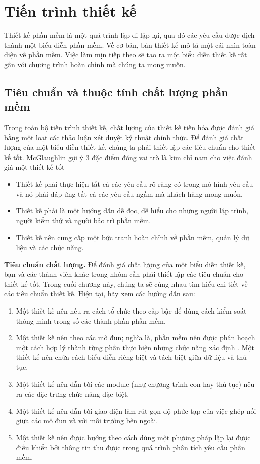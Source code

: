 \documentclass[./../SoftwareEngineering.tex]{subfiles}
\begin{document}
	\section{Tiến trình thiết kế}
	Thiết kế phần mềm là một quá trình lặp đi lặp lại, qua đó các yêu cầu được dịch thành một biểu diễn phần mềm. Về cơ bản, bản thiết kế mô tả một cái nhìn toàn diện về phần mềm. Việc làm mịn tiếp theo sẽ tạo ra một biểu diễn thiết kế rất gần với chương trình hoàn chỉnh mà chúng ta mong muốn.
	
	\subsection{Tiêu chuẩn và thuộc tính chất lượng phần mềm}
	Trong toàn bộ tiến trình thiết kế, chất lượng của thiết kế tiến hóa được đánh giá bằng một loạt các thảo luận xét duyệt kỹ thuật chính thức. Để đánh giá chất lượng của một biểu diễn thiết kế, chúng ta phải thiết lập các tiêu chuẩn cho thiết kế tốt. McGlaughlin \cite{McG91} gợi ý 3 đặc điểm đóng vai trò là kim chỉ nam cho việc đánh giá một thiết kế tốt
	\begin{itemize}
		\item Thiết kế phải thực hiện tất cả các yêu cầu rõ ràng có trong mô hình yêu cầu và nó phải đáp ứng tất cả các yêu cầu ngầm mà khách hàng mong muốn.
		\item Thiết kế phải là một hướng dẫn dễ đọc, dễ hiểu cho những người lập trình, người kiểm thử và người bảo trì phần mềm.
		\item Thiết kế nên cung cấp một bức tranh hoàn chỉnh về phần mềm, quản lý dữ liệu và các chức năng.
	\end{itemize}
	\textbf{Tiêu chuẩn chất lượng.} Để đánh giá chất lượng của một biểu diễn thiết kế, bạn và các thành viên khác trong nhóm cần phải thiết lập các tiêu chuẩn cho thiết kế tốt. Trong cuối chương này, chúng ta sẽ cùng nhau tìm hiểu chi tiết về các tiêu chuẩn thiết kế. Hiện tại, hãy xem các hướng dẫn sau:
	\begin{enumerate}
		\item Một thiết kế nên nêu ra cách tổ chức theo cấp bậc để dùng cách kiểm soát thông minh trong số các thành phần phần mềm.
		\item Một thiết kế nên theo các mô đun; nghĩa là, phần mềm nên được phân hoạch một cách hợp lý thành từng phần thực hiện những chức năng xác định . 
		Một thiết kế nên chứa cách biểu diễn riêng biệt và tách biệt giữa dữ liệu và thủ tục.
		\item Một thiết kế nên dẫn tới các module (như chương trình con hay thủ tục) nêu ra các đặc trưng chức năng đặc biệt. 
		\item Một thiết kế nên dẫn tới giao diện làm rút gọn độ phức tạp của việc ghép nối giữa các mô đun và với môi trường bên ngoài. 
		\item Một thiết kế nên được hướng theo cách dùng một phương pháp lặp lại được điều khiển bởi thông tin thu được trong quá trình phân tích yêu cầu phần mềm. 
		
	\end{enumerate}
	
\end{document}
